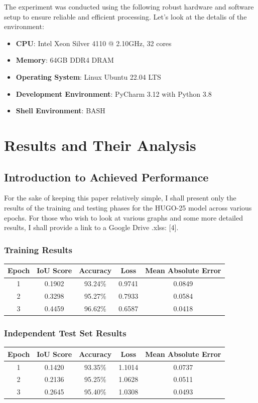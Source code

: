 \documentclass[12pt,a4paper]{article}
\begin{document}
The experiment was conducted using the following robust hardware and software setup to ensure reliable and efficient processing. Let's look at the detalis of the environment:

\begin{itemize}
    \item \textbf{CPU}: Intel Xeon Silver 4110 @ 2.10GHz, 32 cores
    \item \textbf{Memory}: 64GB DDR4 DRAM
    \item \textbf{Operating System}: Linux Ubuntu 22.04 LTS
    \item \textbf{Development Environment}: PyCharm 3.12 with Python 3.8
    \item \textbf{Shell Environment}: BASH
\end{itemize}

\section{Results and Their Analysis}

\subsection{Introduction to Achieved Performance}

For the sake of keeping this paper relatively simple, I shall present only the results of the training and testing phases for the HUGO-25 model across various epochs.
For those who wish to look at various graphs and some more detailed results, I shall provide a link to a Google Drive .xlss: [4].

\subsubsection{Training Results}
\begin{tabular}{|c|c|c|c|c|}
\hline
\textbf{Epoch} & \textbf{IoU Score} & \textbf{Accuracy} & \textbf{Loss} & \textbf{Mean Absolute Error} \\
\hline
1 & 0.1902 & 93.24\% & 0.9741 & 0.0849 \\
2 & 0.3298 & 95.27\% & 0.7933 & 0.0584 \\
3 & 0.4459 & 96.62\% & 0.6587 & 0.0418 \\
\hline
\end{tabular}

\subsubsection{Independent Test Set Results}
\begin{tabular}{|c|c|c|c|c|}
\hline
\textbf{Epoch} & \textbf{IoU Score} & \textbf{Accuracy} & \textbf{Loss} & \textbf{Mean Absolute Error} \\
\hline
1 & 0.1420 & 93.35\% & 1.1014 & 0.0737 \\
2 & 0.2136 & 95.25\% & 1.0628 & 0.0511 \\
3 & 0.2645 & 95.40\% & 1.0308 & 0.0493 \\
\hline
\end{tabular}
\end{document}
